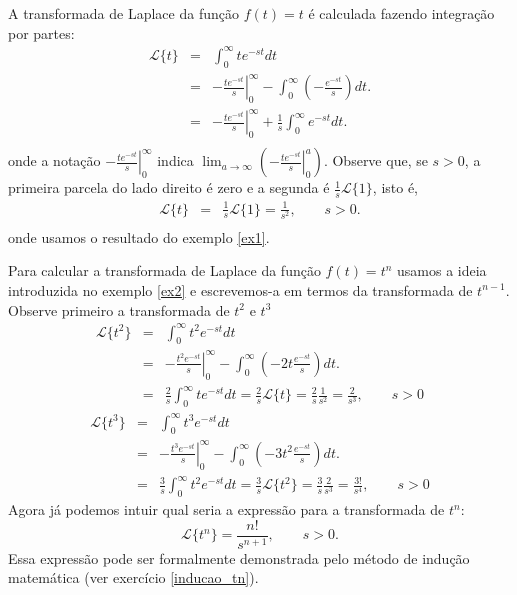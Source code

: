 \begin{ex}\label{ex2} A transformada de Laplace da função $f(t)=t$ é calculada fazendo integração por partes:
\begin{eqnarray*}
\mathcal{L}\{t\}&=&\int_0^\infty te^{-st}dt\\
&=&\left.-\frac{te^{-st}}{s}\right|_0^\infty-\int_0^\infty \left(-\frac{e^{-st}}{s}\right)dt .\\
&=&\left.-\frac{te^{-st}}{s}\right|_0^\infty+\frac{1}{s}\int_0^\infty e^{-st}dt .\\
\end{eqnarray*}
onde a notação $\displaystyle\left.-\frac{te^{-st}}{s}\right|_0^\infty$ indica $\displaystyle\lim_{a\to\infty}\left(\left.-\frac{te^{-st}}{s} \right|_0^a\right)$. Observe que, se $s>0$, a primeira parcela do lado direito é zero e a segunda é $\frac{1}{s}\mathcal{L}\{1\}$, isto é,
\begin{eqnarray*}
\mathcal{L}\{t\}&=&\frac{1}{s}\mathcal{L}\{1\}=\frac{1}{s^2},\qquad s>0.\\
\end{eqnarray*}
onde usamos o resultado do exemplo \ref{ex1}.
\end{ex}
\begin{ex} Para calcular a transformada de Laplace da função $f(t)=t^n$ usamos a ideia introduzida no exemplo \ref{ex2} e escrevemos-a em termos da transformada de $t^{n-1}$. Observe primeiro a transformada de $t^2$ e $t^3$
\begin{eqnarray*}
\mathcal{L}\{t^2\}&=&\int_0^\infty t^2e^{-st}dt\\
&=&\left.-\frac{t^2 e^{-st}}{s}\right|_0^\infty-\int_0^\infty \left(-2t\frac{e^{-st}}{s}\right)dt .\\
&=&\frac{2}{s}\int_0^\infty te^{-st}dt=\frac{2}{s}\mathcal{L}\{t\}=\frac{2}{s}\frac{1}{s^2}=\frac{2}{s^3},\qquad s>0
\end{eqnarray*}
\begin{eqnarray*}
\mathcal{L}\{t^3\}&=&\int_0^\infty t^3e^{-st}dt\\
&=&\left.-\frac{t^3 e^{-st}}{s}\right|_0^\infty-\int_0^\infty \left(-3t^2\frac{e^{-st}}{s}\right)dt .\\
&=&\frac{3}{s}\int_0^\infty t^2e^{-st}dt=\frac{3}{s}\mathcal{L}\{t^2\}=\frac{3}{s}\frac{2}{s^3}=\frac{3!}{s^4},\qquad s>0
\end{eqnarray*}
Agora já podemos intuir qual seria a expressão para a transformada de $t^n$:
\begin{equation}
\mathcal{L}\{t^n\}=\frac{n!}{s^{n+1}},\qquad s>0.
\end{equation}
Essa expressão pode ser formalmente demonstrada pelo método de indução matemática (ver exercício \ref{inducao_tn}).
\end{ex}

